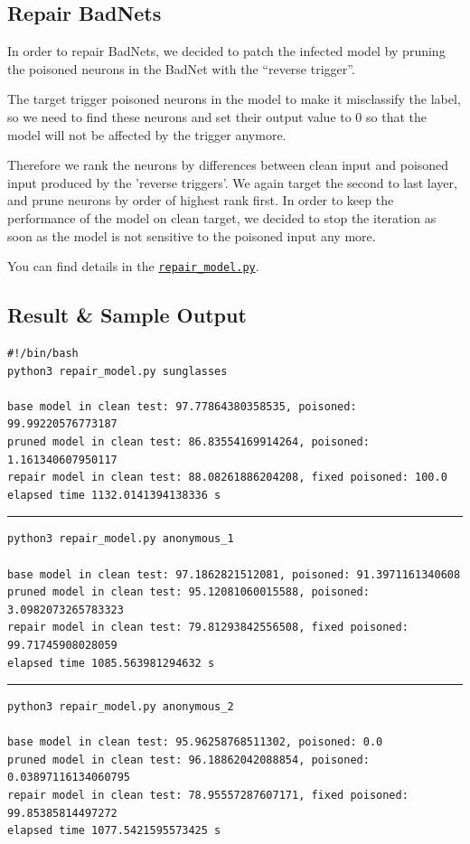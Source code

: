 \documentclass[letterpaper]{article}
\begin{document}
\subsection*{Repair BadNets}
In order to repair BadNets, we decided to patch the infected model by pruning the poisoned neurons in the BadNet with the ``reverse trigger''.

The target trigger poisoned neurons in the model to make it misclassify the label, so we need to find these neurons and set their output value to 0 so that the model will not be affected by the trigger anymore. 

Therefore we rank the neurons by differences between clean input and poisoned input produced by the 'reverse triggers'. We again target the second to last layer, and prune neurons by order of highest rank first. In order to keep the performance of the model on clean target, we decided to stop the iteration as soon as the model is not sensitive to the poisoned input any more.

You can find details in the \href{https://github.com/zjzsliyang/CSAW-HackML-2020/blob/master/repair_model.py}{\texttt{repair\_model.py}}.

\subsection*{Result \& Sample Output}
\begin{lstlisting}
#!/bin/bash
python3 repair_model.py sunglasses

base model in clean test: 97.77864380358535, poisoned: 99.99220576773187
pruned model in clean test: 86.83554169914264, poisoned: 1.161340607950117
repair model in clean test: 88.08261886204208, fixed poisoned: 100.0
elapsed time 1132.0141394138336 s
\end{lstlisting}

\noindent\rule{2cm}{0.4pt}
\begin{lstlisting}
python3 repair_model.py anonymous_1

base model in clean test: 97.1862821512081, poisoned: 91.3971161340608
pruned model in clean test: 95.12081060015588, poisoned: 3.0982073265783323
repair model in clean test: 79.81293842556508, fixed poisoned: 99.71745908028059
elapsed time 1085.563981294632 s
\end{lstlisting}

\noindent\rule{2cm}{0.4pt}
\begin{lstlisting}
python3 repair_model.py anonymous_2

base model in clean test: 95.96258768511302, poisoned: 0.0
pruned model in clean test: 96.18862042088854, poisoned: 0.03897116134060795
repair model in clean test: 78.95557287607171, fixed poisoned: 99.85385814497272
elapsed time 1077.5421595573425 s
\end{lstlisting}
\end{document}
